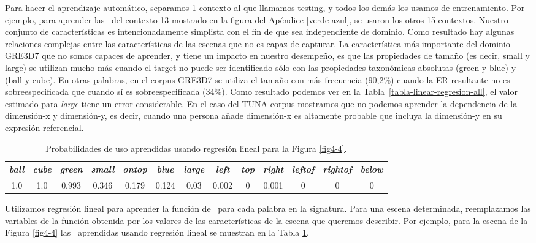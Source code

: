 Para hacer el aprendizaje autom\'atico, separamos 1 contexto al que llamamos testing, y todos los dem\'as los usamos de entrenamiento. Por ejemplo, para aprender las \puse\ del contexto 13 mostrado en la figura del Ap\'endice \ref{verde-azul}, se usaron los otros 15 contextos.
Nuestro conjunto de caracter\'{i}sticas es intencionadamente simplista con el fin de que sea
independiente de dominio. Como resultado hay algunas relaciones complejas
entre las caracter\'{i}sticas de las escenas que no es capaz de
capturar. La caracter\'{i}stica m\'as importante del dominio GRE3D7
que no somos capaces de aprender, y tiene un impacto en nuestro desempe\~no, es que
las propiedades de tama\~no (es decir, small y large) se utilizan mucho
m\'as cuando el target no puede ser identificado s\'olo con las propiedades taxon\'omicas absolutas 
(green y blue) y (ball y cube). En otras palabras, en el corpus GRE3D7 se utiliza el tama\~no con m\'as frecuencia (90,2\%)
cuando la ER resultante no es sobreespecificada que cuando s\'i es sobreespecificada (34\%). 
Como resultado podemos ver en la Tabla~\ref{tabla-linear-regresion-all}, el valor estimado para 
\emph{large} tiene un error considerable. En el caso del TUNA-corpus
  mostramos que no podemos aprender la dependencia de la dimensi\'on-x y
  dimensi\'on-y, es decir, cuando una persona a\~nade dimensi\'on-x es altamente
  probable que incluya la dimensi\'on-y en su expresi\'on referencial.

\medskip
\begin{table}[h!]
\begin{center}
\begin{tabular}{ccccccccccccc}
\hline
\it{ball} & \it{cube} &  \it{green} & \it{small} &  \it{ontop} &  \it{blue} &  \it{large} &  \it{left} &  \it{top} &\it{right} &  \it{leftof} &    \it{rightof} &\it{below} \\
\hline
1.0 & 1.0 & 0.993 &0.346 &0.179 & 0.124 &0.03  &0.002  &0 & 0.001 &0&0&0\\
\hline
\end{tabular}
\caption{Probabilidades de uso aprendidas usando regresi\'on lineal para la Figura \ref{fig4-4}.} 
\label{probability-of-use2}
\end{center}
\end{table}
\vspace*{-0.5cm}
Utilizamos regresi\'on lineal para aprender la funci\'on de
\puse\ para cada palabra en la signatura. Para una escena determinada, reemplazamos
las variables de la funci\'on obtenida por los valores de las caracter\'{i}sticas
de la escena que queremos describir. Por ejemplo, para la escena de la Figura \ref{fig4-4} las \puse\ aprendidas usando regresi\'on lineal se muestran en la Tabla \ref{probability-of-use2}. 

